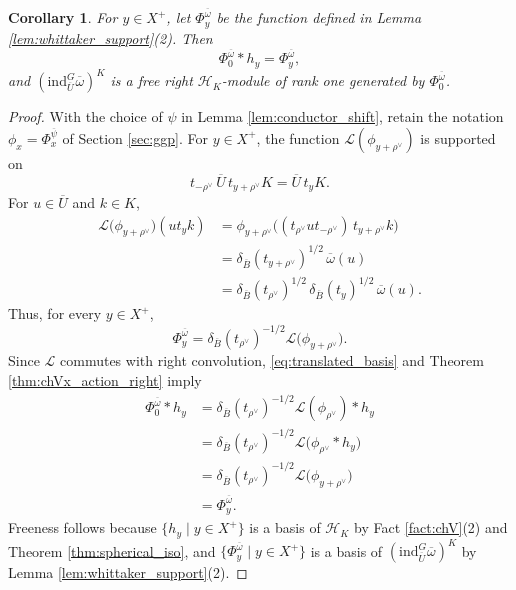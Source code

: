 \documentclass[12pt]{article}
\numberwithin{equation}{section}
\newtheorem{corollary}[theorem]{Corollary}
\theoremstyle{definition}
\theoremstyle{remark}
\theoremstyle{plain}
\begin{document}
\begin{corollary}\label{cor:freeness_O}
For $y \in X^+$, let $\Phi^{\overline{\omega}}_y$ be the function defined in Lemma \ref{lem:whittaker_support}(2). Then
$$\Phi^{\overline{\omega}}_0 * h_y = \Phi^{\overline{\omega}}_y,$$
and $(\mathrm{ind}_{\overline{U}}^G \overline{\omega})^K$ is a free right $\mathcal{H}_K$-module of rank one generated by $\Phi^{\overline{\omega}}_0$.
\end{corollary}
\begin{proof}
With the choice of $\psi$ in Lemma \ref{lem:conductor_shift}, retain the notation $\phi_x=\Phi^{\overline\psi}_x$ of Section \ref{sec:ggp}. For $y\in X^+$, the function $\mathcal{L}(\phi_{y+\rho^\vee})$ is supported on
\[
t_{-\rho^\vee}\,\overline{U}\,t_{y+\rho^\vee}K
=\overline{U}\,t_yK.
\]
For $u\in\overline{U}$ and $k\in K$,
\begin{align*}
\mathcal{L}\big(\phi_{y+\rho^\vee}\big)(ut_yk)
&=\phi_{y+\rho^\vee}
\big((t_{\rho^\vee}ut_{-\rho^\vee})\,t_{y+\rho^\vee}k\big)\\
&= \delta_{\overline{B}}(t_{y+\rho^\vee})^{1/2}\, \overline{\omega}(u)\\
&= \delta_{\overline{B}}(t_{\rho^\vee})^{1/2}\,
   \delta_{\overline{B}}(t_y)^{1/2}\,\overline{\omega}(u).
\end{align*}
Thus, for every $y\in X^+$,
\begin{equation}\label{eq:translated_basis}
\Phi^{\overline\omega}_y
=\delta_{\overline B}(t_{\rho^\vee})^{-1/2}
\mathcal L\big(\phi_{y+\rho^\vee}\big).
\end{equation}
Since $\mathcal{L}$ commutes with right convolution, \eqref{eq:translated_basis} and Theorem \ref{thm:chVx_action_right} imply
\begin{align*}
\Phi^{\overline\omega}_0*h_y
&=\delta_{\overline B}(t_{\rho^\vee})^{-1/2}
  \mathcal L(\phi_{\rho^\vee})*h_y\\
&=\delta_{\overline B}(t_{\rho^\vee})^{-1/2}
  \mathcal L\big(\phi_{\rho^\vee}*h_y\big)\\
&=\delta_{\overline B}(t_{\rho^\vee})^{-1/2}
  \mathcal L\big(\phi_{y+\rho^\vee}\big)\\
&=\Phi^{\overline\omega}_y.
\end{align*}
Freeness follows because $\{h_y\mid y\in X^+\}$ is a basis of $\mathcal H_K$ by Fact \ref{fact:chV}(2) and Theorem \ref{thm:spherical_iso}, and $\{\Phi^{\overline\omega}_y\mid y\in X^+\}$ is a basis of $(\mathrm{ind}_{\overline U}^G\overline\omega)^K$ by Lemma \ref{lem:whittaker_support}(2).
\end{proof}
\end{document}
